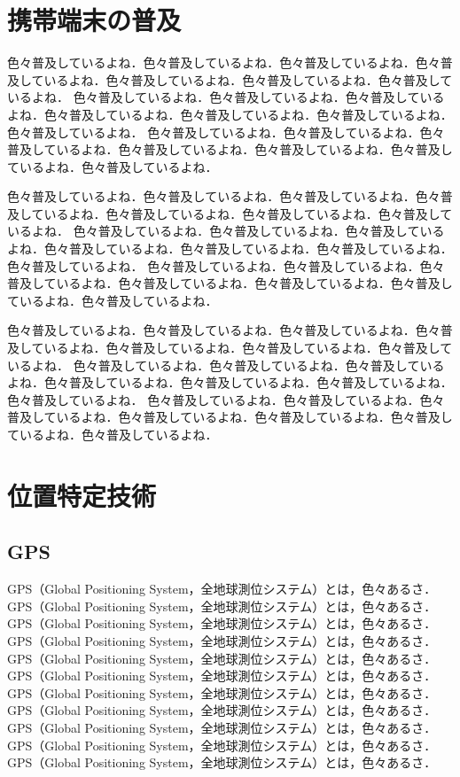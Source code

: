 %
%
\section{携帯端末の普及}
色々普及しているよね．色々普及しているよね．色々普及しているよね．色々普及しているよね．色々普及しているよね．色々普及しているよね．色々普及しているよね．
色々普及しているよね．色々普及しているよね．色々普及しているよね．色々普及しているよね．色々普及しているよね．色々普及しているよね．色々普及しているよね．
色々普及しているよね．色々普及しているよね．色々普及しているよね．色々普及しているよね．色々普及しているよね．色々普及しているよね．色々普及しているよね．

色々普及しているよね．色々普及しているよね．色々普及しているよね．色々普及しているよね．色々普及しているよね．色々普及しているよね．色々普及しているよね．
色々普及しているよね．色々普及しているよね．色々普及しているよね．色々普及しているよね．色々普及しているよね．色々普及しているよね．色々普及しているよね．
色々普及しているよね．色々普及しているよね．色々普及しているよね．色々普及しているよね．色々普及しているよね．色々普及しているよね．色々普及しているよね．

色々普及しているよね．色々普及しているよね．色々普及しているよね．色々普及しているよね．色々普及しているよね．色々普及しているよね．色々普及しているよね．
色々普及しているよね．色々普及しているよね．色々普及しているよね．色々普及しているよね．色々普及しているよね．色々普及しているよね．色々普及しているよね．
色々普及しているよね．色々普及しているよね．色々普及しているよね．色々普及しているよね．色々普及しているよね．色々普及しているよね．色々普及しているよね．

\section{位置特定技術}

\subsection{GPS}
GPS（Global Positioning System，全地球測位システム）とは，色々あるさ．
GPS（Global Positioning System，全地球測位システム）とは，色々あるさ．
GPS（Global Positioning System，全地球測位システム）とは，色々あるさ．
GPS（Global Positioning System，全地球測位システム）とは，色々あるさ．
GPS（Global Positioning System，全地球測位システム）とは，色々あるさ．
GPS（Global Positioning System，全地球測位システム）とは，色々あるさ．
GPS（Global Positioning System，全地球測位システム）とは，色々あるさ．
GPS（Global Positioning System，全地球測位システム）とは，色々あるさ．
GPS（Global Positioning System，全地球測位システム）とは，色々あるさ．
GPS（Global Positioning System，全地球測位システム）とは，色々あるさ．
GPS（Global Positioning System，全地球測位システム）とは，色々あるさ．

